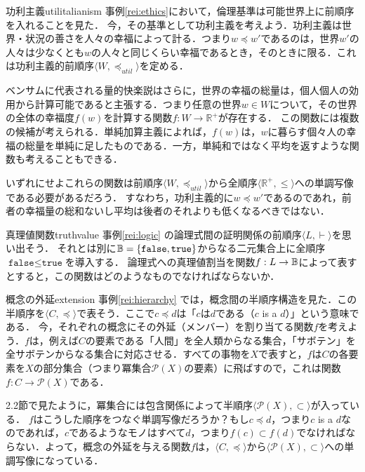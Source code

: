 \documentclass[dvipdfmx,11pt,a4paper]{jsarticle}
\begin{document}
\begin{rei}{功利主義}{utilitalianism}
  事例\ref{rei:ethics}において，倫理基準は可能世界上に前順序を入れることを見た．
  今，その基準として功利主義を考えよう．功利主義は世界・状況の善さを人々の幸福によって計る．つまり$w \preceq w'$であるのは，世界$w'$の人々は少なくとも$w$の人々と同じくらい幸福であるとき，そのときに限る．これは功利主義的前順序$\langle W, \preceq_{util} \rangle$を定める．
 
  ベンサムに代表される量的快楽説はさらに，世界の幸福の総量は，個人個人の効用から計算可能であると主張する．つまり任意の世界$w \in W$について，その世界の全体の幸福度$f(w)$を計算する関数$f: W \to \mathbb{R^+}$が存在する．
  この関数には複数の候補が考えられる．単純加算主義によれば，$f(w)$は，$w$に暮らす個々人の幸福の総量を単純に足したものである．一方，単純和ではなく平均を返すような関数も考えることもできる．
  
  いずれにせよこれらの関数は前順序$\langle W, \preceq_{util} \rangle$から全順序$\langle \mathbb{R^+}, \leq \rangle$への単調写像である必要があるだろう．
  すなわち，功利主義的に$w \preceq w'$であるのであれ，前者の幸福量の総和ないし平均は後者のそれよりも低くなるべきではない．
\end{rei}


\begin{rei}{真理値関数}{truthvalue}
事例\ref{rei:logic} の論理式間の証明関係の前順序$\langle L, \vdash \rangle$を思い出そう．
それとは別に$\mathbb{B} = \{ \texttt{false}, \texttt{true} \}$からなる二元集合上に全順序$\texttt{false} \leq \texttt{true}$を導入する．
論理式への真理値割当を関数$f:L \to \mathbb{B}$によって表すとすると，この関数はどのようなものでなければならないか．
\end{rei}


\begin{rei}{概念の外延}{extension}
事例\ref{rei:hierarchy} では，概念間の半順序構造を見た．この半順序を$\langle C, \preceq \rangle$で表そう．ここで$c \preceq d$は「$c$は$d$である（$c$ is a $d$）」という意味である．
今，それぞれの概念にその外延（メンバー）を割り当てる関数$f$を考えよう．$f$は，例えば$C$の要素である「人間」を全人類からなる集合，「サボテン」を全サボテンからなる集合に対応させる．すべての事物を$X$で表すと，$f$は$C$の各要素を$X$の部分集合（つまり冪集合$\mathcal{P}(X)$の要素）に飛ばすので，これは関数$f: C \to \mathcal{P}(X)$である．

2.2節で見たように，冪集合には包含関係によって半順序$\langle \mathcal{P}(X), \subset \rangle$が入っている．
$f$はこうした順序をつなぐ単調写像だろうか？もし$c \preceq d$，つまり$c$ is a $d$なのであれば，$c$であるようなモノはすべて$d$，つまり$f(c) \subset f(d)$でなければならない．よって，概念の外延を与える関数$f$は，$\langle C, \preceq \rangle$から$\langle \mathcal{P}(X), \subset \rangle$への単調写像になっている．
\end{rei}
\end{document}
